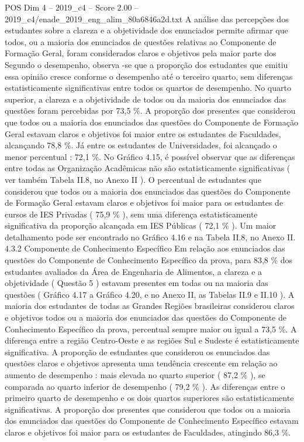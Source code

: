 \begin{textsample}{POS Dim 4 – 2019\_c4 – Score 2.00 – 2019\_c4/enade\_2019\_eng\_alim\_80a6846a2d.txt}
A análise das percepções dos estudantes sobre a clareza e a objetividade dos enunciados permite afirmar que todos, ou a maioria dos enunciados de questões relativas ao Componente de Formação Geral, foram considerados claros e objetivos pela maior parte dos Segundo o desempenho, observa -se que a proporção dos estudantes que emitiu essa opinião cresce conforme o desempenho até o terceiro quarto, sem diferenças estatisticamente significativas entre todos os quartos de desempenho.
No quarto superior, a clareza e a objetividade de todos ou da maioria dos enunciados das questões foram percebidas por 73,5 \%.
A proporção dos presentes que considerou que todos ou a maioria dos enunciados das questões do Componente de Formação Geral estavam claros e objetivos foi maior entre os estudantes de Faculdades, alcançando 78,8 \%.
Já entre os estudantes de Universidades, foi alcançado o menor percentual : 72,1 \%.
No Gráfico 4.15, é possível observar que as diferenças entre todas as Organização Acadêmicas não são estatisticamente significativas ( ver também Tabela II.8, no Anexo II ).
O percentual de estudantes que considerou que todos ou a maioria dos enunciados das questões do Componente de Formação Geral estavam claros e objetivos foi maior para os estudantes de cursos de IES Privadas ( 75,9 \% ), sem uma diferença estatisticamente significativa da proporção alcançada em IES Públicas ( 72,1 \% ).
Um maior detalhamento pode ser encontrado no Gráfico 4.16 e na Tabela II.8, no Anexo II. 4.3.2 Componente de Conhecimento Específico Em relação aos enunciados das questões do Componente de Conhecimento Específico da prova, para 83,8 \% dos estudantes avaliados da Área de Engenharia de Alimentos, a clareza e a objetividade ( Questão 5 ) estavam presentes em todas ou na maioria das questões ( Gráfico 4.17 a Gráfico 4.20, e no Anexo II, as Tabelas II.9 e II.10 ).
A maioria dos estudantes de todas as Grandes Regiões brasileiras considerou claros e objetivos todos ou a maioria dos enunciados das questões do Componente de Conhecimento Específico da prova, percentual sempre maior ou igual a 73,5 \%.
A diferença entre a região Centro-Oeste e as regiões Sul e Sudeste é estatisticamente significativa.
A proporção de estudantes que considerou os enunciados das questões claros e objetivos apresenta uma tendência crescente em relação ao aumento de desempenho : mais elevada no quarto superior ( 87,2 \% ), se comparada ao quarto inferior de desempenho ( 79,2 \% ).
As diferenças entre o primeiro quarto de desempenho e os dois quartos superiores são estatisticamente significativas.
A proporção dos presentes que considerou que todos ou a maioria dos enunciados das questões do Componente de Conhecimento Específico estavam claros e objetivos foi maior para os estudantes de Faculdades, atingindo 86,3 \%.

\end{textsample}
